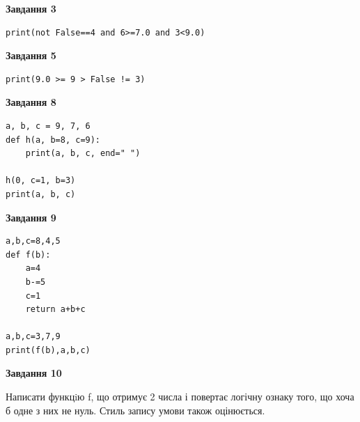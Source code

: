 \documentclass[12pt, ukrainian]{article}
\begin{document}
{\begin {large}
\begin{minipage}[t]{7.5cm}
\end{minipage}
\vline \hspace{6mm}
\begin{minipage}[t]{10.5cm}

\begin{center}
\textbf{Завдання 3}
\end{center}

\begin{verbatim}
print(not False==4 and 6>=7.0 and 3<9.0)
\end{verbatim}



\begin{center}
\textbf{Завдання 5}
\end{center}

\begin{verbatim}
print(9.0 >= 9 > False != 3)
\end{verbatim}



\begin{center}
\textbf{Завдання 8}
\end{center}

\begin{verbatim}
a, b, c = 9, 7, 6
def h(a, b=8, c=9):
    print(a, b, c, end=" ")

h(0, c=1, b=3)
print(a, b, c)
\end{verbatim}



\begin{center}
\textbf{Завдання 9}
\end{center}

\begin{verbatim}
a,b,c=8,4,5
def f(b):
    a=4
    b-=5
    c=1
    return a+b+c

a,b,c=3,7,9
print(f(b),a,b,c)
\end{verbatim}



\begin{center}
\textbf{Завдання 10}
\end{center}

Написати функцiю f, що отримує 2 числа і повертає логічну ознаку того, що хоча б одне з них не нуль. Стиль запису умови також оцінюється.\par

\end{minipage}

\end {large}}
\newpage
\end{document}
